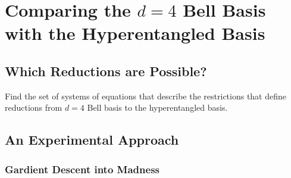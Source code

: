 \chapter{Comparing the $d=4$ Bell Basis with the Hyperentangled Basis}

\section{Which Reductions are Possible?}

Find the set of systems of equations that describe the restrictions that define reductions from $d=4$ Bell basis to the hyperentangled basis.

\section{An Experimental Approach}

\subsection{Gardient Descent into Madness}